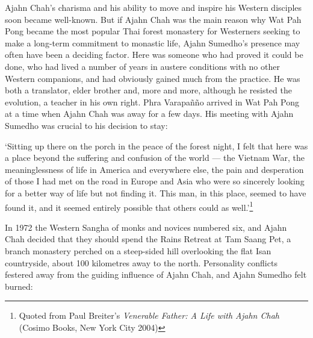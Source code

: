 Ajahn Chah's charisma and his ability to move and inspire his Western
disciples soon became well-known. But if Ajahn Chah was the main reason
why Wat Pah Pong became the most popular Thai forest monastery for
Westerners seeking to make a long-term commitment to monastic life,
Ajahn Sumedho's presence may often have been a deciding factor. Here was
someone who had proved it could be done, who had lived a number of years
in austere conditions with no other Western companions, and had
obviously gained much from the practice. He was both a translator, elder
brother and, more and more, although he resisted the evolution, a
teacher in his own right. Phra Varapañño arrived in Wat Pah Pong at a
time when Ajahn Chah was away for a few days. His meeting with Ajahn
Sumedho was crucial to his decision to stay:

`Sitting up there on the porch in the peace of the forest night, I felt
that here was a place beyond the suffering and confusion of the world
--- the Vietnam War, the meaninglessness of life in America and
everywhere else, the pain and desperation of those I had met on the road
in Europe and Asia who were so sincerely looking for a better way of
life but not finding it. This man, in this place, seemed to have found
it, and it seemed entirely possible that others could as
well.'\footnote{Quoted from Paul Breiter's \emph{Venerable Father: A
  Life with Ajahn Chah} (Cosimo Books, New York City 2004)}

In 1972 the Western Sangha of monks and novices numbered six, and Ajahn
Chah decided that they should spend the Rains Retreat at Tam Saang Pet,
a branch monastery perched on a steep-sided hill overlooking the flat
Isan countryside, about 100 kilometres away to the north. Personality
conflicts festered away from the guiding influence of Ajahn Chah, and
Ajahn Sumedho felt burned:

